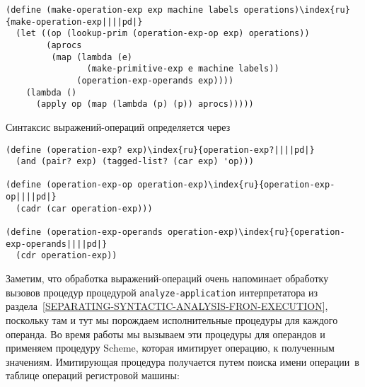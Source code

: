 \begin{Verbatim}[fontsize=\small]
(define (make-operation-exp exp machine labels operations)\index{ru}{make-operation-exp||||pd|}
  (let ((op (lookup-prim (operation-exp-op exp) operations))
        (aprocs
         (map (lambda (e)
                (make-primitive-exp e machine labels))
              (operation-exp-operands exp))))
    (lambda ()
      (apply op (map (lambda (p) (p)) aprocs)))))
\end{Verbatim}
Синтаксис выражений-операций определяется через

\begin{Verbatim}[fontsize=\small]
(define (operation-exp? exp)\index{ru}{operation-exp?||||pd|}
  (and (pair? exp) (tagged-list? (car exp) 'op)))

(define (operation-exp-op operation-exp)\index{ru}{operation-exp-op||||pd|}
  (cadr (car operation-exp)))

(define (operation-exp-operands operation-exp)\index{ru}{operation-exp-operands||||pd|}
  (cdr operation-exp))
\end{Verbatim}

Заметим, что обработка выражений-операций очень
напоминает обработку вызовов процедур процедурой
{\tt analyze-application} интерпретатора из 
раздела~\ref{SEPARATING-SYNTACTIC-ANALYSIS-FRON-EXECUTION},
поскольку там и тут мы порождаем исполнительные процедуры для каждого
операнда.  Во время работы мы вызываем эти процедуры для операндов и
применяем процедуру Scheme, которая имитирует операцию, к полученным
значениям.  Имитирующая процедура получается путем поиска имени
операции~в таблице операций регистровой машины:

